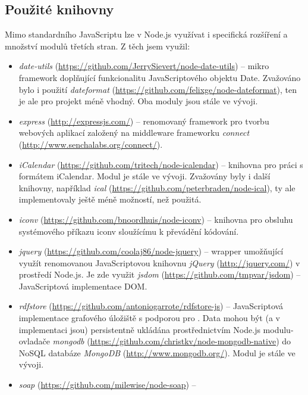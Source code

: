 \subsection{Použité knihovny}
Mimo standardního JavaScriptu lze v Node.js využívat i specifická rozšíření a množství modulů třetích stran. Z těch jsem využil:
\begin{itemize}
 \item \emph{date-utils} (\url{https://github.com/JerrySievert/node-date-utils}) -- mikro framework doplňující funkcionalitu JavaScriptového objektu Date. Zvažováno bylo i použití \emph{dateformat} (\url{https://github.com/felixge/node-dateformat}), ten je ale pro projekt méně vhodný. Oba moduly jsou stále ve vývoji.
 \item \emph{express} (\url{http://expressjs.com/}) -- renomovaný framework pro tvorbu webových aplikací založený na middleware frameworku \emph{connect} (\url{http://www.senchalabs.org/connect/}).
 \item \emph{iCalendar} (\url{https://github.com/tritech/node-icalendar}) -- knihovna pro práci s formátem iCalendar. Modul je stále ve vývoji. Zvažovány byly i další knihovny, například \emph{ical} (\url{https://github.com/peterbraden/node-ical}), ty ale implementovaly ještě méně možností, než použitá.
 \item \emph{iconv} (\url{https://github.com/bnoordhuis/node-iconv}) -- knihovna pro obsluhu systémového příkazu iconv sloužícímu k převádění kódování.
 \item \emph{jquery} (\url{https://github.com/coolaj86/node-jquery}) -- wrapper umožňující využít renomovanou JavaScriptovou knihovnu \emph{jQuery} (\url{http://jquery.com/}) v prostředí Node.js. Je zde využit \emph{jsdom} (\url{https://github.com/tmpvar/jsdom}) -- JavaScriptová implementace DOM.
 \item \emph{rdfstore} (\url{https://github.com/antoniogarrote/rdfstore-js}) -- JavaScriptová implementace \emph{} grafového úložiště s podporou pro \emph{}. Data mohou být (a v implementaci  jsou) persistentně ukládána prostřednictvím Node.js modulu-ovladače \emph{mongodb} (\url{https://github.com/christkv/node-mongodb-native}) do NoSQL databáze \emph{MongoDB} (\url{http://www.mongodb.org/}). Modul je stále ve vývoji.
 \item \emph{soap} (\url{https://github.com/milewise/node-soap}) -- 
\end{itemize}

